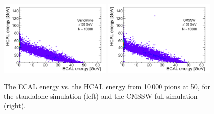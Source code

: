 \begin{figure}[hbtp]
\begin{center}
\includegraphics[width=0.49\textwidth]{figures/g4_banana_plot_tot_50gev.pdf}
\includegraphics[width=0.49\textwidth]{figures/fs_banana_plot_tot_50gev.pdf}
\caption{The ECAL energy vs. the HCAL energy from 10\,000 pions at 50\GeV, for the standalone simulation (left) and the CMSSW full simulation (right).}
\label{fig:valbanana}
\end{center}
\end{figure}

